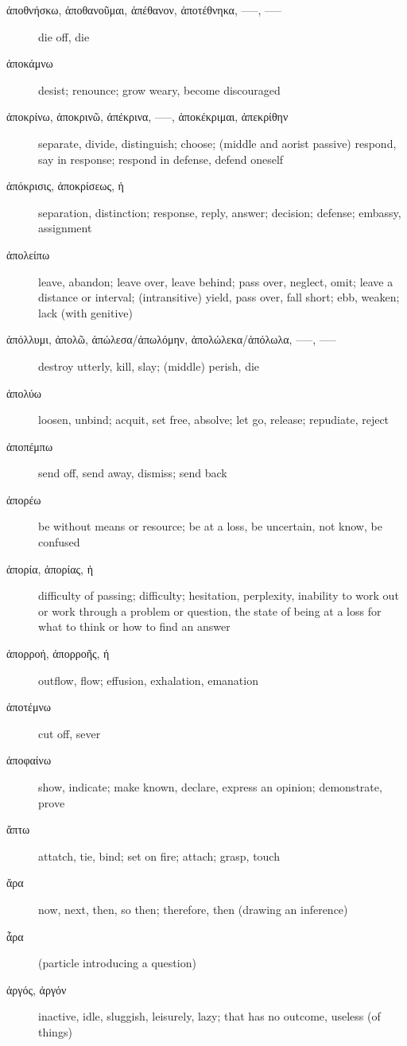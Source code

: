 \documentclass[12pt,letterpaper]{article}
\begin{document}
\begin{description}
    \item[\textgreek{ἀποθνήσκω, ἀποθανοῦμαι, ἀπέθανον, ἀποτέθνηκα, –––, –––}] \marginnote{*}die off, die
    \item[\textgreek{ἀποκάμνω}] desist; renounce; grow weary, become discouraged
    \item[\textgreek{ἀποκρίνω, ἀποκρινῶ, ἀπέκρινα, –––, ἀποκέκριμαι, ἀπεκρίθην}] \marginnote{*}separate, divide, distinguish; choose; (middle and aorist passive) respond, say in response; respond in defense, defend oneself
    \item[\textgreek{ἀπόκρισις, ἀποκρίσεως, ἡ}] separation, distinction; response, reply, answer; decision; defense; embassy, assignment
    \item[\textgreek{ἀπολείπω}] leave, abandon; leave over, leave behind; pass over, neglect, omit; leave a distance or interval; (intransitive) yield, pass over, fall short; ebb, weaken; lack (with genitive)
    \item[\textgreek{ἀπόλλυμι, ἀπολῶ, ἀπώλεσα/ἀπωλόμην, ἀπολώλεκα/ἀπόλωλα, –––, –––}] \marginnote{*}destroy utterly, kill, slay; (middle) perish, die
    \item[\textgreek{ἀπολύω}] loosen, unbind; acquit, set free, absolve; let go, release; repudiate, reject
    \item[\textgreek{ἀποπέμπω}] send off, send away, dismiss; send back
    \item[\textgreek{ἀπορέω}] be without means or resource; be at a loss, be uncertain, not know, be confused
    \item[\textgreek{ἀπορία, ἀπορίας, ἡ}] difficulty of passing; difficulty; hesitation, perplexity, inability to work out or work through a problem or question, the state of being at a loss for what to think or how to find an answer
    \item[\textgreek{ἀπορροή, ἀπορροῆς, ἡ}] outflow, flow; effusion, exhalation, emanation
    \item[\textgreek{ἀποτέμνω}] cut off, sever
    \item[\textgreek{ἀποφαίνω}] show, indicate; make known, declare, express an opinion; demonstrate, prove
    \item[\textgreek{ἅπτω}] attatch, tie, bind; set on fire; attach; grasp, touch
    \item[\textgreek{ἄρα}] \marginnote{*}now, next, then, so then; therefore, then (drawing an inference)
    \item[\textgreek{ἆρα}] \marginnote{*}(particle introducing a question)
    \item[\textgreek{ἀργός, ἀργόν}] inactive, idle, sluggish, leisurely, lazy; that has no outcome, useless (of things)

\end{description}
\end{document}
